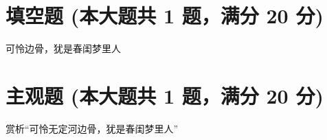 \documentclass[12pt, a4paper, addpoints]{exam}
\begin{document}
\hspace{5cm}

\section{\normalsize{填空题 (本大题共 1 题，满分 20 分)}}
\hspace{1.5cm}

\begin{questions}
\question[20] 可怜\uline{\qquad\qquad\qquad}边骨，犹是春闺梦里人

\end{questions}

\hspace{5cm}

\section{\normalsize{主观题 (本大题共 1 题，满分 20 分)}}
\hspace{1.5cm}

\begin{questions}
\question[20] 赏析“可怜无定河边骨，犹是春闺梦里人”


\end{questions}
\end{document}
